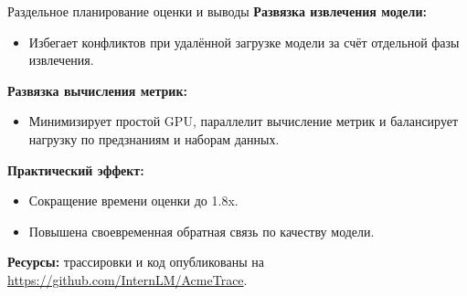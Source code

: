 \begin{frame}{Раздельное планирование оценки и выводы}
	\textbf{Развязка извлечения модели:}
	\begin{itemize}
		\item Избегает конфликтов при удалённой загрузке модели за счёт отдельной фазы извлечения.
	\end{itemize}
	
	\textbf{Развязка вычисления метрик:}
	\begin{itemize}
		\item Минимизирует простой GPU, параллелит вычисление метрик и балансирует нагрузку по предзнаниям и наборам данных.
	\end{itemize}
	
	\textbf{Практический эффект:}
	\begin{itemize}
		\item Сокращение времени оценки до 1.8x.
		\item Повышена своевременная обратная связь по качеству модели.
	\end{itemize}
	
	\textbf{Ресурсы:} трассировки и код опубликованы на \url{https://github.com/InternLM/AcmeTrace}.
\end{frame}